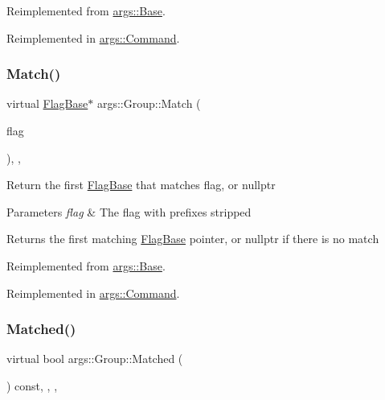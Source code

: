 Reimplemented from \hyperlink{classargs_1_1_base_a72e11d38c82b8dca87b830853676b68c}{args\+::\+Base}.



Reimplemented in \hyperlink{classargs_1_1_command_acc75daa42b98b9be35718f072a46f13a}{args\+::\+Command}.

\mbox{\label{classargs_1_1_group_a31872f412d5b32e0afaf962cd2ce5e40}} 
\subsubsection{\texorpdfstring{Match()}{Match()}}
{\footnotesize\ttfamily virtual \hyperlink{classargs_1_1_flag_base}{Flag\+Base}$\ast$ args\+::\+Group\+::\+Match (\begin{DoxyParamCaption}\item[{const \hyperlink{structargs_1_1_either_flag}{Either\+Flag} \&}]{flag }\end{DoxyParamCaption})\hspace{0.3cm}{\ttfamily [inline]}, {\ttfamily [override]}, {\ttfamily [virtual]}}

Return the first \hyperlink{classargs_1_1_flag_base}{Flag\+Base} that matches flag, or nullptr


\begin{DoxyParams}{Parameters}
{\em flag} & The flag with prefixes stripped \\
\hline
\end{DoxyParams}
\begin{DoxyReturn}{Returns}
the first matching \hyperlink{classargs_1_1_flag_base}{Flag\+Base} pointer, or nullptr if there is no match 
\end{DoxyReturn}


Reimplemented from \hyperlink{classargs_1_1_base_a6d5a7be35d62f59fee5a52c06af3003e}{args\+::\+Base}.



Reimplemented in \hyperlink{classargs_1_1_command_ace018e92977b0e6ec5472cae0166523c}{args\+::\+Command}.

\mbox{\label{classargs_1_1_group_a7794d31edae97254be440b8768db9af0}} 
\subsubsection{\texorpdfstring{Matched()}{Matched()}}
{\footnotesize\ttfamily virtual bool args\+::\+Group\+::\+Matched (\begin{DoxyParamCaption}{ }\end{DoxyParamCaption}) const\hspace{0.3cm}{\ttfamily [inline]}, {\ttfamily [override]}, {\ttfamily [virtual]}, {\ttfamily [noexcept]}}


